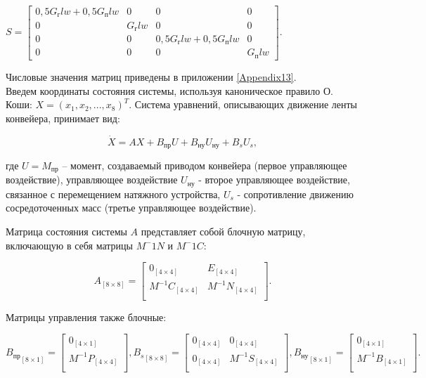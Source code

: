 $ S = 
\begin{bmatrix}
	0,5 G_{\text{г}} l w + 0,5 G_{\text{п}} l w & 0                & 0                                            & 0                \\
	0                                           & G_{\text{г}} l w & 0                                            & 0                \\
	0                                           & 0                & 0,5 G_{\text{г}} l w + 0,5 G_{\text{п}} l w  & 0                \\
	0                                           & 0                & 0                                            & G_{\text{п}} l w   
\end{bmatrix}.
$

Числовые значения матриц приведены в приложении \ref{Appendix13}.\\

Введем координаты состояния системы, используя каноническое правило О. Коши: $ X = (x_1, x_2, ..., x_8)^T$. Система уравнений, описывающих движение ленты конвейера, принимает вид:

$$ \dot X = AX + B_\text{пр}U + B_\text{ну}U_\text{ну} + B_s U_s, $$

где $ U = M_\text{пр} $ -- момент, создаваемый приводом конвейера (первое управляющее воздействие), управляющее воздействие $ U_\text{ну} $ - второе управляющее воздействие, связанное с перемещением натяжного устройства, $ U_s $ - сопротивление движению сосредоточенных масс (третье управляющее воздействие).

Матрица состояния системы $ A $ представляет собой блочную матрицу, включающую в себя матрицы $ M^-1 N $ и $ M^-1 C $:

$$
A_{[8 \times 8]} = 
\begin{bmatrix}
 0_{[4 \times 4]}        & E_{[4 \times 4]}        \\
 M^{-1} C_{[4 \times 4]} & M^{-1} N_{[4 \times 4]} \\
\end{bmatrix}.
$$

Матрицы управления также блочные:

$$
{B_\text{пр}}_{[8 \times 1]} = 
\begin{bmatrix}
 0_{[4 \times 1]}                                  \\
 M^{-1}P_{[4 \times 4]}                            \\
\end{bmatrix}, {B_s}_{[8 \times 8]} = 
\begin{bmatrix}
 0_{[4 \times 4]} & 0_{[4 \times 4]}               \\
 0_{[4 \times 4]} & M^{-1}S_{[4 \times 4]}         \\
\end{bmatrix}, {B_\text{ну}}_{[8 \times 1]} = 
\begin{bmatrix}
 0_{[4 \times 1]}                                  \\
 M^{-1}B_{[4 \times 1]}                           \\
\end{bmatrix}.
$$

